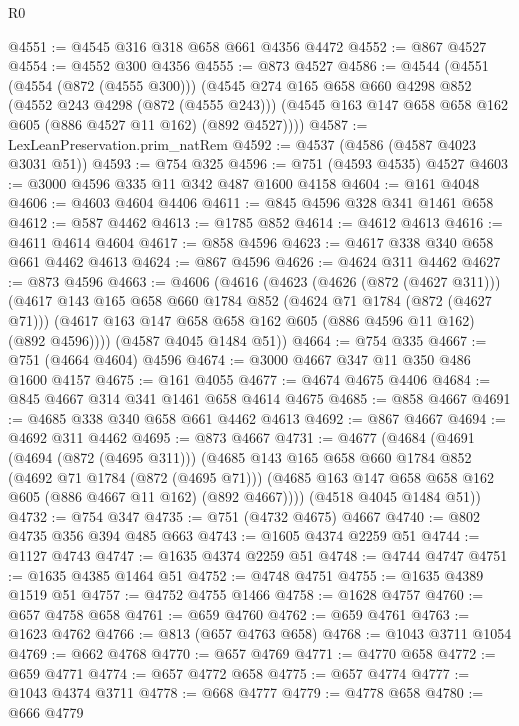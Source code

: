 \begin{lexlean}{R0}
\begin{coremodule}
@4551 := @4545 @316 @318 @658 @661 @4356 @4472
@4552 := @867 @4527
@4554 := @4552 @300 @4356
@4555 := @873 @4527
@4586 := @4544
    (@4551
      (@4554 (@872 (@4555 @300)))
      (@4545
        @274
        @165
        @658
        @660
        @4298
        @852
        (@4552 @243 @4298 (@872 (@4555 @243)))
        (@4545 @163 @147 @658 @658 @162 @605 (@886 @4527 @11 @162) (@892 @4527))))
@4587 := LexLeanPreservation.prim_natRem
@4592 := @4537 (@4586 (@4587 @4023 @3031 @51))
@4593 := @754 @325
@4596 := @751 (@4593 @4535) @4527
@4603 := @3000 @4596 @335 @11 @342 @487 @1600 @4158
@4604 := @161 @4048
@4606 := @4603 @4604 @4406
@4611 := @845 @4596 @328 @341 @1461 @658
@4612 := @587 @4462
@4613 := @1785 @852
@4614 := @4612 @4613
@4616 := @4611 @4614 @4604
@4617 := @858 @4596
@4623 := @4617 @338 @340 @658 @661 @4462 @4613
@4624 := @867 @4596
@4626 := @4624 @311 @4462
@4627 := @873 @4596
@4663 := @4606
    (@4616
      (@4623
        (@4626 (@872 (@4627 @311)))
        (@4617
          @143
          @165
          @658
          @660
          @1784
          @852
          (@4624 @71 @1784 (@872 (@4627 @71)))
          (@4617 @163 @147 @658 @658 @162 @605 (@886 @4596 @11 @162) (@892 @4596))))
      (@4587 @4045 @1484 @51))
@4664 := @754 @335
@4667 := @751 (@4664 @4604) @4596
@4674 := @3000 @4667 @347 @11 @350 @486 @1600 @4157
@4675 := @161 @4055
@4677 := @4674 @4675 @4406
@4684 := @845 @4667 @314 @341 @1461 @658 @4614 @4675
@4685 := @858 @4667
@4691 := @4685 @338 @340 @658 @661 @4462 @4613
@4692 := @867 @4667
@4694 := @4692 @311 @4462
@4695 := @873 @4667
@4731 := @4677
    (@4684
      (@4691
        (@4694 (@872 (@4695 @311)))
        (@4685
          @143
          @165
          @658
          @660
          @1784
          @852
          (@4692 @71 @1784 (@872 (@4695 @71)))
          (@4685 @163 @147 @658 @658 @162 @605 (@886 @4667 @11 @162) (@892 @4667))))
      (@4518 @4045 @1484 @51))
@4732 := @754 @347
@4735 := @751 (@4732 @4675) @4667
@4740 := @802 @4735 @356 @394 @485 @663
@4743 := @1605 @4374 @2259 @51
@4744 := @1127 @4743
@4747 := @1635 @4374 @2259 @51
@4748 := @4744 @4747
@4751 := @1635 @4385 @1464 @51
@4752 := @4748 @4751
@4755 := @1635 @4389 @1519 @51
@4757 := @4752 @4755 @1466
@4758 := @1628 @4757
@4760 := @657 @4758 @658
@4761 := @659 @4760
@4762 := @659 @4761
@4763 := @1623 @4762
@4766 := @813 (@657 @4763 @658)
@4768 := @1043 @3711 @1054
@4769 := @662 @4768
@4770 := @657 @4769
@4771 := @4770 @658
@4772 := @659 @4771
@4774 := @657 @4772 @658
@4775 := @657 @4774
@4777 := @1043 @4374 @3711
@4778 := @668 @4777
@4779 := @4778 @658
@4780 := @666 @4779

\end{coremodule}
\end{lexlean}
